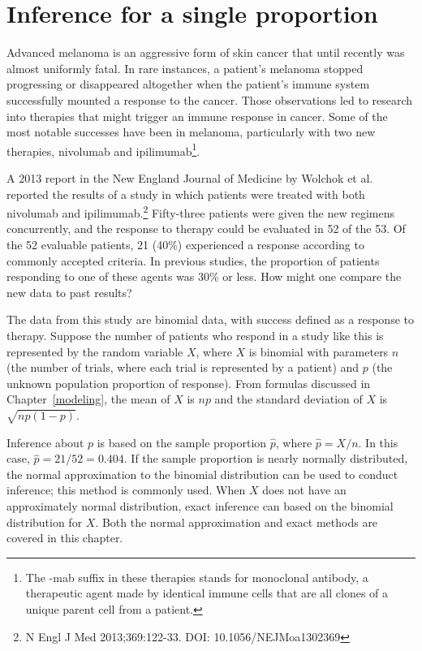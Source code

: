 \section{Inference for a single proportion}
\label{singleProportion}

Advanced melanoma is an aggressive form of skin cancer that until recently was almost uniformly fatal.  In rare instances, a patient's melanoma stopped progressing or disappeared altogether when the patient's immune system successfully mounted a response to the cancer. Those observations led to research into therapies that might trigger an immune response in cancer.  Some of the most notable successes have been in melanoma, particularly with two new therapies, nivolumab and ipilimumab\footnote{The -mab suffix in these therapies stands for monoclonal antibody, a therapeutic agent made by identical immune cells that are all clones of a unique parent cell from a patient.}.

A 2013 report in the New England Journal of Medicine by Wolchok et al. reported the results of a study in which patients were treated with both nivolumab and ipilimumab.\footnote{N Engl J Med 2013;369:122-33. DOI: 10.1056/NEJMoa1302369}   Fifty-three patients were given the new regimens concurrently, and the response to therapy could be evaluated in 52 of the 53.  Of the 52 evaluable patients, 21 (40\%) experienced a response according to commonly accepted criteria.  In previous studies, the proportion of patients responding to one of these agents was 30\% or less.  How might one compare the new data to past results?

The data from this study are binomial data, with success defined as a response to therapy. Suppose the number of patients who respond in a study like this is represented by the random variable $X$, where $X$ is binomial with parameters $n$ (the number of trials, where each trial is represented by a patient) and $p$ (the unknown population proportion of response). From formulas discussed in Chapter~\ref{modeling}, the mean of $X$ is $np$ and the standard deviation of $X$ is $\sqrt{np(1-p)}$.

Inference about $p$ is based on the sample proportion $\hat{p}$, where $\hat{p} = X/n$. In this case, $\hat{p} = 21/52 = 0.404$. If the sample proportion is nearly normally distributed, the normal approximation to the binomial distribution can be used to conduct inference; this method is commonly used.  When $X$ does not have an approximately normal distribution, exact inference can  based on the binomial distribution for $X$.  Both the normal approximation and exact methods are covered in this chapter.

